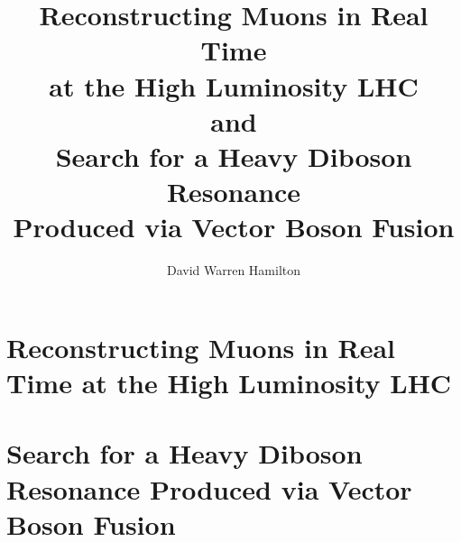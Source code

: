 \documentclass[PhD]{uclathes}
\title{
Reconstructing Muons in Real Time\\
at the High Luminosity LHC\\
and\\
Search for a Heavy Diboson Resonance\\
Produced via Vector Boson Fusion
}
\author{David Warren Hamilton}
\begin{document}
\makeintropages

\part{Reconstructing Muons in Real Time at the High Luminosity LHC}





\part{Search for a Heavy Diboson Resonance Produced via Vector Boson Fusion}








{}

%
\end{document}
